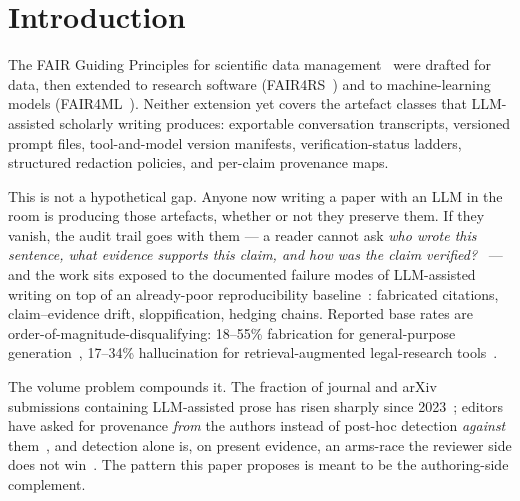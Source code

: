 \section{Introduction}
\label{sec:intro}

The FAIR Guiding Principles for scientific data
management~\cite{wilkinson2016fair} were drafted for data, then
extended to research software (FAIR4RS~\cite{chuehong2022fair4rs}) and
to machine-learning models (FAIR4ML~\cite{ravi2024fair4ml}). Neither
extension yet covers the artefact classes that LLM-assisted scholarly
writing produces: exportable conversation transcripts, versioned
prompt files, tool-and-model version manifests, verification-status
ladders, structured redaction policies, and per-claim provenance maps.

This is not a hypothetical gap. Anyone now writing a paper with an
LLM in the room is producing those artefacts, whether or not they
preserve them. If they vanish, the audit trail goes with them ---
a reader cannot ask \emph{who wrote this sentence, what evidence
supports this claim, and how was the claim
verified?}~\cite{krebs2026obscurity} --- and the work sits exposed
to the documented failure modes of LLM-assisted writing on top of
an already-poor reproducibility
baseline~\cite{ioannidis2005,pineau2021reproducibility}:
fabricated citations, claim--evidence drift, sloppification,
hedging chains. Reported base rates are
order-of-magnitude-disqualifying: 18--55\% fabrication for
general-purpose
generation~\cite{walters2023fabrication}, 17--34\% hallucination
for retrieval-augmented legal-research
tools~\cite{magesh2024legal}.

The volume problem compounds it. The fraction of journal and arXiv
submissions containing LLM-assisted prose has risen sharply since
2023~\cite{liang2024mapping,vannoorden2023chatgpt,kobak2024delving};
editors have asked for provenance \emph{from} the authors instead
of post-hoc detection \emph{against}
them~\cite{else2023chatgpt,thorp2023chatgpt},
and detection alone is, on present evidence, an arms-race the
reviewer side does not
win~\cite{sadasivan2023reliably}. The pattern
this paper proposes is meant to be the authoring-side complement.


